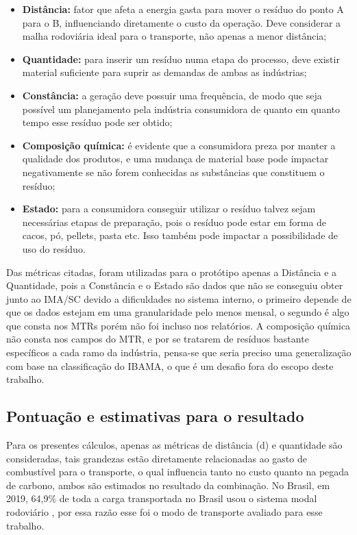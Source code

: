 \begin{itemize} 
	\item \textbf{Distância:} fator que afeta a energia gasta para mover o resíduo do ponto A para o B, influenciando diretamente o custo da operação. Deve considerar a malha rodoviária ideal para o transporte, não apenas a menor distância;
	\item \textbf{Quantidade:} para inserir um resíduo numa etapa do processo, deve existir material suficiente para suprir as demandas de ambas as indústrias;
	\item \textbf{Constância:} a geração deve possuir uma frequência, de modo que seja possível um planejamento pela indústria consumidora de quanto em quanto tempo esse resíduo pode ser obtido;
  \item \textbf{Composição química:} é evidente que a consumidora preza por manter a qualidade dos produtos, e uma mudança de material base pode impactar negativamente se não forem conhecidas as substâncias que constituem o resíduo;
  \item \textbf{Estado:} para a consumidora conseguir utilizar o resíduo talvez sejam necessárias etapas de preparação, pois o resíduo pode estar em forma de cacos, pó, pellets, pasta etc. Isso também pode impactar a possibilidade de uso do resíduo.
\end{itemize}

Das métricas citadas, foram utilizadas para o protótipo apenas a Distância e a Quantidade, pois a Constância e o Estado são dados que não se conseguiu obter junto ao \gls{IMA/SC} devido a dificuldades no sistema interno, o primeiro depende de que os dados estejam em uma granularidade pelo menos mensal, o segundo é algo que consta nos \gls{MTR}s porém não foi incluso nos relatórios. A composição química não consta nos campos do \gls{MTR}, e por se tratarem de resíduos bastante específicos a cada ramo da indústria, pensa-se que seria preciso uma generalização com base na classificação do \gls{IBAMA}, o que é um desafio fora do escopo deste trabalho. 

\subsection{Pontuação e estimativas para o resultado}

Para os presentes cálculos, apenas as métricas de distância (\gls{d}) e quantidade são consideradas, tais grandezas estão diretamente relacionadas ao gasto de combustível para o transporte, o qual influencia tanto no custo quanto na pegada de carbono, ambos são estimados no resultado da combinação. No Brasil, em 2019, 64,9\% de toda a carga transportada no Brasil usou o sistema modal rodoviário \cite{cnt_o_nodate}, por essa razão esse foi o modo de transporte avaliado para esse trabalho.

